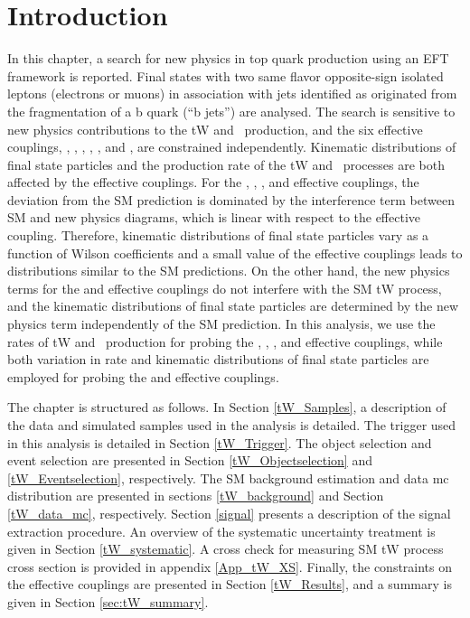 \section{Introduction}
\label{tW_Int}



In this chapter, a search for new physics in top quark production using an EFT framework is reported. Final states with two same flavor opposite-sign isolated leptons (electrons or muons) in association with jets identified as originated from the fragmentation of a b quark (``b jets'') are analysed.
The search is sensitive to new physics contributions to the tW and \ttbar ~production, and the six effective couplings, \CG, \Cphiq, \CtW, \CtG, \CuG, and \CcG, are constrained independently.
Kinematic distributions of final state particles and the production rate of the tW and \ttbar ~processes are both affected by the effective couplings. For the \Cphiq, \CtW, \CtG, and \CG effective couplings, the deviation from the SM prediction is dominated by the interference term between SM and new physics diagrams, which is linear with respect to the effective coupling. Therefore, kinematic distributions of final state particles vary as a function of Wilson coefficients and a small value of the effective couplings leads to distributions similar to the SM predictions.
On the other hand, the new physics terms for the \CuG and \CcG effective couplings do not interfere with the SM tW process, and the kinematic distributions of final state particles are determined by the new physics term independently of the SM prediction.
In this analysis, we use the rates of tW and \ttbar ~production for probing the \Cphiq, \CtW, \CtG, and \CG effective couplings, while both variation in rate and kinematic distributions of final state particles are employed  for probing the \CuG and \CcG effective couplings.





The chapter is structured as follows. In Section \ref{tW_Samples}, a description of the data and simulated samples used in the analysis is detailed. The trigger used in this analysis is detailed in Section \ref{tW_Trigger}. The object selection and event selection are presented in Section \ref{tW_Objectselection} and \ref{tW_Eventselection}, respectively. The SM background estimation and data mc distribution are presented in sections \ref{tW_background} and Section \ref{tW_data_mc}, respectively.
Section \ref{signal} presents a description of the signal extraction procedure.
An overview of the systematic uncertainty treatment is given in Section \ref{tW_systematic}. A cross check for measuring SM tW process cross section is provided in appendix \ref{App_tW_XS}.
Finally, the constraints on the effective couplings are presented in Section \ref{tW_Results}, and a summary is given in Section \ref{sec:tW_summary}.
